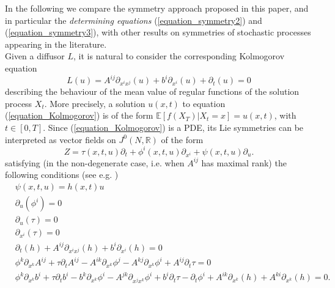 \documentclass{article}[10pt]
\newcommand{\refeqn}[1]{(\ref{#1})}
\begin{document}
In the following we compare the symmetry approach proposed in this paper, and in particular the \emph{ determining equations} \refeqn{equation_symmetry2}
and \refeqn{equation_symmetry3}, with  other results on symmetries of stochastic processes appearing  in the literature.\\
Given a diffusor $L$, it is natural to consider the corresponding Kolmogorov equation
\begin{equation}\label{equation_Kolmogorov}
L(u)=A^{ij}\partial_{x^ix^j}(u)+b^i\partial_{x^i}(u)+\partial_t(u)=0
\end{equation}
describing the behaviour of the mean value of regular functions of the solution process $X_t$. More precisely, a solution $u(x,t)$ to
equation \refeqn{equation_Kolmogorov} is of the form $\mathbb{E}[f(X_T)|X_t=x]=u(x,t)$, with $t\in [0,T]$. Since
\refeqn{equation_Kolmogorov} is a PDE, its Lie symmetries can be interpreted as vector fields on $J^0(N,\mathbb{R})$ of the form
$$
Z=\tau(x,t,u)\partial_{t}+\phi^i(x,t,u)\partial_{x^i}+\psi(x,t,u)\partial_u.
$$
satisfying (in the non-degenerate case, i.e. when $A^{ij}$ has maximal rank) the following conditions (see e.g. \cite{Gaeta1999,Olver1993})
\begin{eqnarray*}
&\psi(x,t,u)=h(x,t)u&\\
&\partial_u(\phi^i)=0&\\
&\partial_u(\tau)=0&\\
&\partial_{x^i}(\tau)=0&\\
&\partial_t(h)+A^{ij}\partial_{x^ix^j}(h)+b^i\partial_{x^i}(h)=0&\\
&\phi^k\partial_{x^k}A^{ij}+\tau\partial_tA^{ij}-A^{ik}\partial_{x^k}\phi^j-A^{kj}\partial_{x^k}\phi^i+A^{ij}\partial_t\tau=0&\\
&\phi^k\partial_{x^k}b^i+\tau \partial_tb^i-b^k\partial_{x^k}\phi^i-A^{jk}\partial_{x^jx^k}\phi^i+b^i\partial_t\tau-\partial_t\phi^i+A^{ik}\partial_{x^k}(h)+A^{ki}\partial_{x^k}(h)=0.&
\end{eqnarray*}
\end{document}
